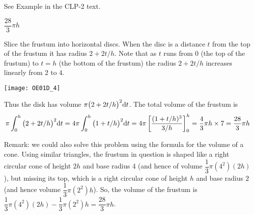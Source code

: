 \begin{hint}
See Example  in the
CLP-2 text.
\end{hint}

\begin{answer}
$\dfrac{28}{3}\pi h$
\end{answer}

\begin{solution}
Slice the frustum into horizontal discs. When the disc is a distance
$t$ from the top of the frustum it has radius $2+2t/h$. Note that as $t$
runs from $0$ (the top of the frustum) to $t=h$ (the bottom of the frustum)
the radius $2+2t/h$ increases linearly from $2$ to $4$.
\begin{center}
       \texttt{[image: OE01D\_4]}
\end{center}
 Thus the disk has volume $\pi \big(2+2t/h\big)^2 \mathrm{d}t$. The total volume of the
frustum is
\begin{align*}
\pi\int_0^h \big(2+2t/h\big)^2 \mathrm{d}t
=4\pi\int_0^h \big(1+t/h\big)^2 \mathrm{d}t
=4\pi\left[\frac{(1+t/h)^3}{3/h}\right]_0^h
=\frac{4}{3}\pi h\times 7
=\frac{28}{3}\pi h
\end{align*}

Remark: we could also solve this problem using the formula for the volume of a cone. Using similar triangles, the frustum in question is shaped like a right circular cone of height $2h$ and base radius 4 (and hence of volume $\dfrac{1}{3}\pi(4^2)(2h)$), but missing its top, which is a right circular cone of height $h$ and base radius $2$ (and hence volume $\dfrac{1}{3}\pi(2^2)h$). So, the volume of the frustum is $\dfrac{1}{3}\pi(4^2)(2h) - \dfrac{1}{3}\pi(2^2)h = \dfrac{28}{3}\pi h$.
\end{solution}







\subsection*{\Application}

